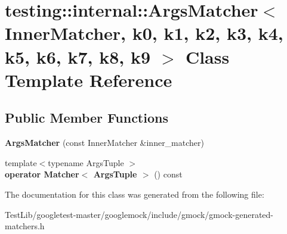 \hypertarget{classtesting_1_1internal_1_1ArgsMatcher}{}\section{testing\+:\+:internal\+:\+:Args\+Matcher$<$ Inner\+Matcher, k0, k1, k2, k3, k4, k5, k6, k7, k8, k9 $>$ Class Template Reference}
\label{classtesting_1_1internal_1_1ArgsMatcher}
\subsection*{Public Member Functions}
\begin{DoxyCompactItemize}
\item 
\mbox{\label{classtesting_1_1internal_1_1ArgsMatcher_a2879d7455f2da2a5a2f2b6759dbc0561}} 
{\bfseries Args\+Matcher} (const Inner\+Matcher \&inner\+\_\+matcher)
\item 
\mbox{\label{classtesting_1_1internal_1_1ArgsMatcher_ad55698b0de384a9d8875cef5b172cb4a}} 
{\footnotesize template$<$typename Args\+Tuple $>$ }\\{\bfseries operator Matcher$<$ Args\+Tuple $>$} () const
\end{DoxyCompactItemize}


The documentation for this class was generated from the following file\+:\begin{DoxyCompactItemize}
\item 
Test\+Lib/googletest-\/master/googlemock/include/gmock/gmock-\/generated-\/matchers.\+h\end{DoxyCompactItemize}
